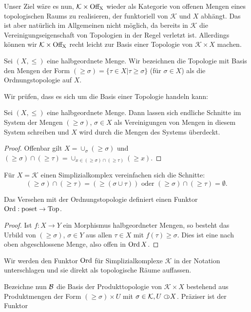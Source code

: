 Unser Ziel wäre es nun, $\mathcal{K} \times \operatorname{Off_X}$ wieder als
Kategorie von offenen Mengen eines topologischen Raums zu realisieren,
der funktoriell von $\mathcal{K}$ und $X$ abhängt. Das ist aber
natürlich im Allgemeinen nicht möglich, da bereits in $\mathcal{K}$
die Vereinigungseigenschaft von Topologien in der Regel verletzt
ist. Allerdings können wir $\mathcal{K} \times \operatorname{Off_X}$ recht leicht zur
Basis einer Topologie von $\mathcal{K} \times X$ machen.
\begin{defn}
  Sei $(X, \leq)$ eine halbgeordnete Menge.  Wir bezeichnen die
  Topologie mit Basis den Mengen der Form $(\geq \sigma) = \{\tau \in
  X | \tau \geq \sigma\}$ (für $\sigma \in X$) als die
  Ordnungstopologie auf $X$.
\end{defn}
Wir prüfen, dass es sich um die Basis einer Topologie handeln kann:
\begin{lemma}
  Sei $(X, \leq)$ eine halbgeordnete Menge. Dann lassen sich endliche
  Schnitte im System der Mengen $(\geq \sigma)$, $\sigma \in X$ als
  Vereinigungen von Mengen in diesem System schreiben und $X$ wird
  durch die Mengen des Systems überdeckt.
\end{lemma}
\begin{proof}
  Offenbar gilt $X = \cup_\sigma (\geq \sigma)$ und $(\geq \sigma)
  \cap (\geq \tau) = \cup_{x \in (\geq \sigma) \cap (\geq \tau)} (\geq
  x)$.
\end{proof}

Für $X = \mathcal{K}$ einen Simplizialkomplex vereinfachen sich die
Schnitte:
\[(\geq \sigma) \cap (\geq \tau) = (\geq (\sigma \cup \tau))
\text{ oder }
(\geq \sigma) \cap (\geq \tau) = \emptyset. \]

\begin{lemma} \label{ord-functor}
  Das Versehen mit der Ordnungstopologie definiert einen Funktor
  $\operatorname{Ord}: \operatorname{poset} \to \operatorname{Top}$.
\end{lemma}
\begin{proof}
  Ist $f: X \to Y$ ein Morphismus halbgeordneter Mengen, so besteht
  das Urbild von $(\geq \sigma)$, $\sigma \in Y$ aus allen $\tau \in
  X$ mit $f(\tau) \geq \sigma$. Dies ist eine nach oben abgeschlossene
  Menge, also offen in $\operatorname{Ord} X$.
\end{proof}
Wir werden den Funktor $\operatorname{Ord}$ für Simplizialkomplexe $\mathcal{K}$ in
der Notation unterschlagen und sie direkt als topologische Räume
auffassen.

Bezeichne nun $\mathcal{B}$ die Basis der Produkttopologie von
$\mathcal{K} \times X$ bestehend aus Produktmengen der Form $(\geq
\sigma) \times U$ mit $\sigma \in \mathcal{K}, U \subset\kern-0.58em\circ X$. Präziser
ist der Funktor
  
